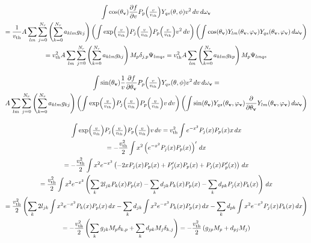 \documentclass{article}
\newcommand{\myint}{\int\limits}
\newcommand{\diff}[1]{\, d#1}
\newcommand{\vect}[1]{\mathbf{#1}}
\newcommand{\of}[1]{\mleft( #1 \mright)}
\newcommand{\vth}{v_\textrm{th}}
\begin{document}
\begin{multline*}
\myint \cos\of{\theta_\vect{v}} \frac{\partial f}{\partial v} P_p\of{\textstyle\frac{v}{\vth}} Y_{qs}\of{\theta,\phi} v^2 \diff{v} \diff{\omega_{\vect{v}}}
\\
=
\frac{1}{\vth}
A \sum_{lm} \sum_{j=0}^{N_r} \left(\sum_{k=0}^{N_r} a_{klm} g_{kj} \right) 
\left(
\int 
\exp\of{\textstyle\frac{v}{\vth}} P_j\of{\textstyle\frac{v}{\vth}} P_p\of{\textstyle\frac{v}{\vth}} v^2 
\diff{v}
\right)
\left(
\int
\cos\of{\theta_\vect{v}} 
Y_{lm}\of{\theta_{\vect{v}},\varphi_{\vect{v}}}
Y_{qs}\of{\theta_{\vect{v}},\varphi_{\vect{v}}}
\diff{\omega_{\vect{v}}}
\right)
\\
=
\vth^2
A \sum_{lm} \sum_{j=0}^{N_r} \left(\sum_{k=0}^{N_r} a_{klm} g_{kj} \right) 
M_{p} \delta_{j,p}
\Psi_{lmqs}
=
\vth^2
A \sum_{lm} \left(\sum_{k=0}^{N_r} a_{klm} g_{kp} \right) 
M_{p}
\Psi_{lmqs}
\end{multline*}

\begin{multline*}
\myint \sin\of{\theta_\vect{v}} \frac{1}{v} \frac{\partial f}{\partial \vect{\theta}_{\vect{v}}} P_p\of{\textstyle\frac{v}{\vth}} Y_{qs}\of{\theta,\phi} v^2 \diff{v} \diff{\omega_{\vect{v}}}
=
\\
A \sum_{lm} \sum_{j=0}^{N_r} \left(\sum_{k=0}^{N_r} a_{klm} g_{kj} \right) 
\left(
\int 
\exp\of{\textstyle\frac{v}{\vth}} P_j\of{\textstyle\frac{v}{\vth}} P_p\of{\textstyle\frac{v}{\vth}} v
\diff{v}
\right)
\left(
\int
\sin\of{\theta_\vect{v}} 
Y_{qs}\of{\theta_{\vect{v}},\varphi_{\vect{v}}}
\frac{\partial }{\partial \vect{\theta}_{\vect{v}}}
Y_{lm}\of{\theta_{\vect{v}},\varphi_{\vect{v}}}
\diff{\omega_{\vect{v}}}
\right)
\end{multline*}

\begin{multline*}
\int 
\exp\of{\textstyle\frac{v}{\vth}} P_j\of{\textstyle\frac{v}{\vth}} P_p\of{\textstyle\frac{v}{\vth}} v
\diff{v}
=
\vth^2
\int 
e^{-x^2} P_j\of{x} P_p\of{x} x
\diff{x}
\\
=
-
\frac{\vth^2}{2}
\int 
x^2
\left(
e^{-x^2} P_j\of{x} P_p\of{x}
\right)'
\diff{x}
\\
=
-
\frac{\vth^2}{2}
\int 
x^2
e^{-x^2} 
\left(
-2x
P_j\of{x} P_p\of{x}
+
P^\prime_j\of{x} P_p\of{x}
+
P_j\of{x} P^\prime_p\of{x}
\right)
\diff{x}
\\
=
\frac{\vth^2}{2}
\int 
x^2
e^{-x^2} 
\left(
\sum_{k} 2l_{jk} P_k\of{x} P_p\of{x}
-
\sum_{k} d_{jk} P_k\of{x} P_p\of{x}
-
\sum_{k} d_{pk} P_j\of{x} P_k\of{x}
\right)
\diff{x}
\\
=
\frac{\vth^2}{2}
\left(
\sum_{k} 2l_{jk} \int x^2 e^{-x^2} P_k\of{x} P_p\of{x} \diff{x}
-
\sum_{k} d_{jk} \int x^2 e^{-x^2} P_k\of{x} P_p\of{x} \diff{x}
-
\sum_{k} d_{pk} \int x^2 e^{-x^2} P_j\of{x} P_k\of{x} \diff{x}
\right)
\\
=
-
\frac{\vth^2}{2}
\left(
\sum_{k} g_{jk} M_p \delta_{k,p}
+
\sum_{k} d_{pk} M_j \delta_{k,j} 
\right)
=
-
\frac{\vth^2}{2}
\left(
g_{jp} M_p
+
d_{pj} M_j
\right)
\end{multline*}
\end{document}

